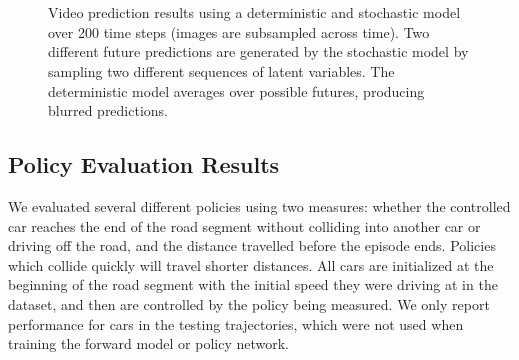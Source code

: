 \documentclass{article} %
\begin{document}
\begin{figure}[t!]
    \centering
     \\
     \\
    \caption{Video prediction results using a deterministic and stochastic model over 200 time steps (images are subsampled across time). Two different future predictions are generated by the stochastic model by sampling two different sequences of latent variables. The deterministic model averages over possible futures, producing blurred predictions.}
    \label{prediction-results}
\end{figure}









    \subsection{Policy Evaluation Results}

    We evaluated several different policies using two measures: whether the controlled car reaches the end of the road segment without colliding into another car or driving off the road, and the distance travelled before the episode ends. Policies which collide quickly will travel shorter distances. All cars are initialized at the beginning of the road segment with the initial speed they were driving at in the dataset, and then are controlled by the policy being measured. We only report performance for cars in the testing trajectories, which were not used when training the forward model or policy network.
\end{document}
